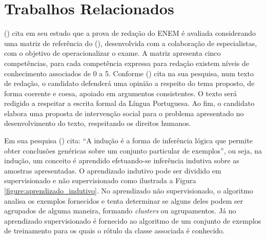 \section{Trabalhos Relacionados}
\label{section:trabalhos_relacionados}

 (\citeyear{silvio_taynan:2017}) cita 
em seu estudo que a prova de redação do ENEM é avaliada considerando uma matriz 
de referência do \citeauthor{edital_enem:2016} (\citeyear{edital_enem:2016}), 
desenvolvida com a colaboração de especialistas, com o objetivo de 
operacionalizar o exame. A matriz apresenta cinco competências, para cada 
competência expressa para redação existem níveis de conhecimento associados de 
0 a 5. Conforme  (\citeyear{braga:2015}) cita na
sua pesquisa, num texto de redação, o candidato defenderá uma opinião a 
respeito do tema proposto, de forma coerente e coesa, apoiado em argumentos 
consistentes. O texto será redigido a respeitar a escrita formal da Língua 
Portuguesa. Ao fim, o candidato elabora uma proposta de intervenção social para 
o problema apresentado no desenvolvimento do texto, respeitando os direitos 
humanos.

Em sua pesquisa  
(\citeyear{monard_baranauskas:2003}) cita: ``A indução é a forma de 
inferência lógica que permite obter conclusões genéricas sobre um conjunto 
particular de exemplos'', ou seja, na indução, um conceito é aprendido 
efetuando-se inferência indutiva sobre as amostras apresentadas. O aprendizado 
indutivo pode ser dividido em supervisionado e não supervisionado como 
ilustrada a Figura \ref{figure:aprendizado_indutivo}. No aprendizado não 
supervisionado, o algoritmo analisa os exemplos fornecidos e tenta determinar 
se alguns deles podem ser agrupados de alguma maneira, formando 
\textit{clusters} ou agrupamentos. Já no aprendizado supervisionado é fornecido 
ao algoritmo de um conjunto de exemplos de treinamento para os quais o rótulo 
da classe associada é conhecido.

